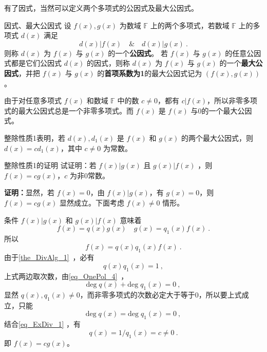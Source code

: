 有了因式，当然可以定义两个多项式的公因式及最大公因式。
\begin{definition}{因式、最大公因式}\label{def_ExDiv_2}
设 $f(x),g(x)$ 为数域 $\mathbb{F}$ 上的两个多项式，若数域 $\mathbb{F}$ 上的多项式 $d(x)$ 满足
\begin{equation}
d(x)|f(x)\quad\&\quad d(x)|g(x)~.
\end{equation}
则称 $d(x)$ 为 $f(x)$ 与 $g(x)$ 的一个\textbf{公因式}。
若 $f(x)$ 与 $g(x)$ 的任意公因式都是它们公因式 $d(x)$ 的因式，则称 $d(x)$ 为 $f(x)$ 与 $g(x)$ 的一个\textbf{最大公因式}，并把 $f(x)$ 与 $g(x)$ 的\textbf{首项系数为1}的最大公因式记为 $(f(x),g(x))$。
\end{definition}

由于对任意多项式 $f(x)$ 和数域 $\mathbb{F}$ 中的数 $c\neq 0$，都有 $c|f(x)$，所以非零多项式的最大公因式总是一个非零多项式。而 $f(x)$ 是 $f(x)$ 与0的一个最大公因式。

整除性质1表明，若 $d(x),d_1(x)$ 是 $f(x)$ 和 $g(x)$ 的两个最大公因式，则 $d(x)=cd_1(x)$，其中 $c\neq 0$ 为常数。
\begin{example}{整除性质1的证明}\label{ex_ExDiv_1}
试证明：若 $f(x)|g(x)$ 且 $g(x)|f(x)$ ，则 $f(x)=cg(x)$，$c$ 为非0常数。

\textbf{证明：}显然，若 $f(x)=0$，由 $f(x)|g(x)$，有 $g(x)=0$，则 $f(x)=cg(x)$ 显然成立。下面考虑 $f(x)\neq 0$ 情形。

条件 $f(x)|g(x)$ 和 $g(x)|f(x)$ 意味着
\begin{equation}
f(x)=q(x)g(x)\quad g(x)=q_1(x)f(x)~.
\end{equation}
所以
\begin{equation}
f(x)=q(x)q_1(x)f(x)~.
\end{equation}
由于\autoref{the_DivAlg_1}~，必有
\begin{equation}\label{eq_ExDiv_1}
q(x)q_1(x)=1~,
\end{equation}
上式两边取次数，由\autoref{eq_OnePol_4}~，
\begin{equation}
\mathrm{deg}\;q(x)+\mathrm{deg}\;q_1(x)=0~,
\end{equation}
显然 $q(x),q_1(x)\neq 0$，而非零多项式的次数必定大于等于0，所以要上式成立，只能
\begin{equation}
\mathrm{deg}\;q(x)=\mathrm{deg}\;q_1(x)=0~,
\end{equation}
结合\autoref{eq_ExDiv_1} ，有
 \begin{equation}
 q(x)=1/q_1(x)=c\neq 0~.
 \end{equation}
 即 $f(x)=cg(x)$。

\end{example}

